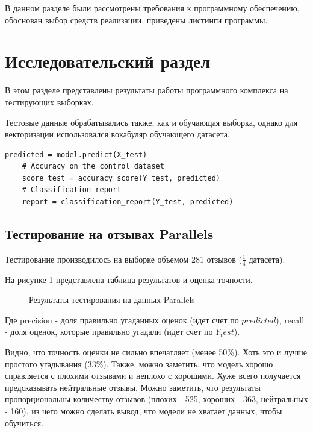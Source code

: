 \documentclass[a4paper,12pt]{article}
\begin{document}
	В данном разделе были рассмотрены требования к 
	программному обеспечению, обоснован выбор средств 
	реализации, приведены листинги программы.
	
	\newpage
	
	\section{Исследовательский раздел}
	
	В этом разделе представлены результаты работы программного комплекса на тестирующих выборках.
	
	Тестовые данные обрабатывались также, как и обучающая выборка, однако для векторизации использовался вокабуляр обучающего датасета.
	
	\begin{lstlisting}[label=lst3,caption=Тестирование модели]
	predicted = model.predict(X_test)
	# Accuracy on the control dataset
	score_test = accuracy_score(Y_test, predicted)
	# Classification report
	report = classification_report(Y_test, predicted)
	\end{lstlisting}
	
	\subsection{Тестирование на отзывах Parallels}
	
	Тестирование производилось на выборке объемом 281 отзывов ($\frac{1}{4}$ датасета).
	
	На рисунке \ref{fig:parallels} представлена таблица результатов и оценка точности.
	
	\begin{figure}[h!]
		\caption{Результаты тестирования на данных Parallels}
		\label{fig:parallels}
	\end{figure}
	Где precision - доля правильно угаданных оценок (идет счет по $predicted$), recall - доля оценок, которые правильно угадали  (идет счет по $Y_test$).
	
	Видно, что точность оценки не сильно впечатляет (менее 50\%). Хоть это и лучше простого угадывания (33\%). Также, можно заметить, что модель хорошо справляется с плохими отзывами и неплохо с хорошими. Хуже всего получается предсказывать нейтральные отзывы. Можно заметить, что результаты пропорциональны количеству отзывов (плохих - 525, хороших - 363, нейтральных - 160), из чего можно сделать вывод, что модели не хватает данных, чтобы обучиться.
\end{document}
